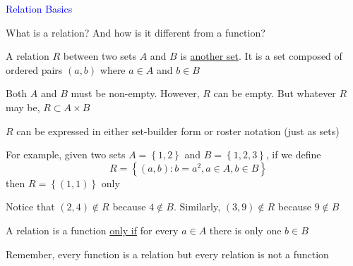 \documentclass[14pt,fleqn]{extarticle}
\begin{document}
 
\begin{skill}
    \begin{narrow}
         \textcolor{blue}{Relation Basics}
         
         What is a relation? And how is it different from a function? 
    \end{narrow}
    
    \reason 
    
    A relation $R$ between two sets $A$ and $B$ is \underline{another set}. It is a set composed of ordered pairs $(a,b)$ where $a\in A$ and $b\in B$\newline 
    
    Both $A$ and $B$ must be non-empty. However, $R$ can be empty. But whatever $R$ may be, $R\subset A\times B$\newline 
    
    $R$ can be expressed in either set-builder form or roster notation (just as sets) \newline 
    
    For example, given two sets $A = \left\lbrace 1,2\right\rbrace$ and $B = \left\lbrace 1,2,3\right\rbrace$, if we define 
    \[ \quad R = \left\lbrace (a,b) : b=a^2, a\in A, b\in B\right\rbrace\]
    then $R = \left\lbrace (1,1) \right\rbrace$ only\newline 
    
    Notice that $(2,4) \notin R$ because $4\notin B$. Similarly, $(3,9)\notin R$ because $9\notin B$\newline 
    
    A relation is a function \underline{only if} for every $a\in A$ there is only one $b\in B$\newline 
    
    Remember, every function is a relation but every relation is not a function
\end{skill}
\end{document}
